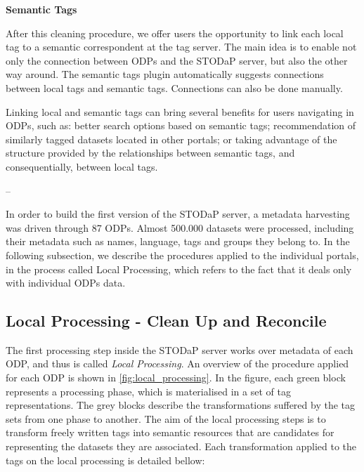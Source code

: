 \noindent\textbf{Semantic Tags}

After this cleaning procedure, we offer users the opportunity to link each local tag to a semantic correspondent at the tag server.
The main idea is to enable not only the connection between ODPs and the STODaP server, but also the other way around.
The semantic tags plugin automatically suggests connections between local tags and semantic tags.
Connections can also be done manually.

Linking local and semantic tags can bring several benefits for users navigating in ODPs, such as: better search options based on semantic tags; recommendation of similarly tagged datasets located in other portals; or taking advantage of the structure provided by the relationships between semantic tags, and consequentially, between local tags.

--

In order to build the first version of the STODaP server, a metadata harvesting was driven through 87 ODPs.
Almost 500.000 datasets were processed, including their metadata such as names, language, tags and groups they belong to.
In the following subsection, we describe the procedures applied to the individual portals, in the process called Local Processing, which refers to the fact that it deals only with individual ODPs data.


\subsection{Local Processing - Clean Up and Reconcile}
\label{sec:local_building}

The first processing step inside the STODaP server works over metadata of each ODP, and thus is called \emph{Local Processing}.
An overview of the procedure applied for each ODP is shown in \autoref{fig:local_processing}.
In the figure, each green block represents a processing phase, which is materialised in a set of tag representations. 
The grey blocks describe the transformations suffered by the tag sets from one phase to another.
The aim of the local processing steps is to transform freely written tags into semantic resources that are candidates for representing the datasets they are associated.
Each transformation applied to the tags on the local processing is detailed bellow:

